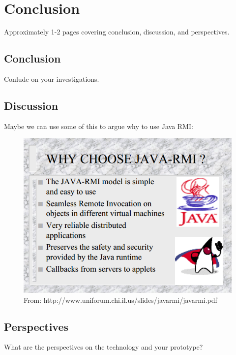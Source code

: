 \documentclass[Main]{subfiles}
\begin{document}
\chapter{Conclusion}
Approximately 1-2 pages covering conclusion, discussion, and perspectives.
\section{Conclusion}
Conlude on your investigations.
\section{Discussion}

Maybe we can use some of this to argue why to use Java RMI:
\begin{figure}[H]
\centering
\includegraphics[scale=1]{Figurer/discussion.png}
\caption{From: http://www.uniforum.chi.il.us/slides/javarmi/javarmi.pdf}
\end{figure}


\section{Perspectives}
What are the perspectives on the technology and your prototype? 
\end{document}
